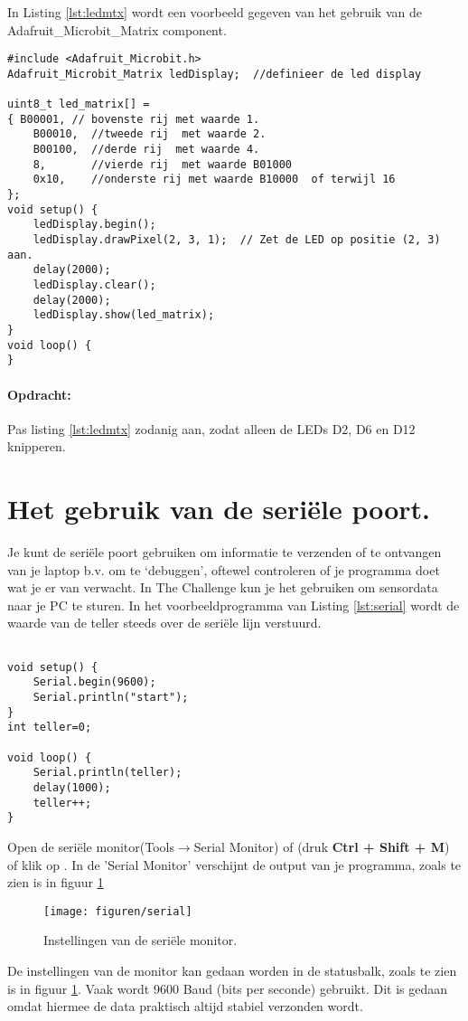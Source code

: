 In Listing \ref{lst:ledmtx} wordt een voorbeeld gegeven van het gebruik van de Adafruit\_Microbit\_Matrix component.

\begin{lstlisting}[caption= Een LED matrix demo,label={lst:ledmtx},firstnumber=1]		
#include <Adafruit_Microbit.h>
Adafruit_Microbit_Matrix ledDisplay;  //definieer de led display

uint8_t led_matrix[] =
{ B00001, // bovenste rij met waarde 1.
	B00010,  //tweede rij  met waarde 2.
	B00100,  //derde rij  met waarde 4.
	8,       //vierde rij  met waarde B01000
	0x10,    //onderste rij met waarde B10000  of terwijl 16
};
void setup() {
	ledDisplay.begin(); 
	ledDisplay.drawPixel(2, 3, 1);  // Zet de LED op positie (2, 3) aan.
	delay(2000);  
	ledDisplay.clear();  
	delay(2000);  
	ledDisplay.show(led_matrix);
}
void loop() {
}
\end{lstlisting}

\paragraph{Opdracht: }Pas listing \ref{lst:ledmtx} zodanig aan, zodat alleen de LEDs D2, D6 en D12 knipperen.\label{blz:opdrmLEDSmatrix}


\section{Het gebruik van de seriële poort.}

Je kunt de seriële poort gebruiken om informatie te verzenden of te ontvangen van je laptop b.v. om te ‘debuggen’, oftewel controleren of je programma doet wat je er van verwacht. In The Challenge kun je het gebruiken om sensordata naar je PC te sturen. In het voorbeeldprogramma van Listing \ref{lst:serial} wordt de waarde van de teller steeds over de seriële lijn verstuurd.

\begin{lstlisting}[caption= Een LED matrix demo,label={lst:serial},firstnumber=1]		
	
void setup() {
	Serial.begin(9600);
	Serial.println("start");
}
int teller=0;

void loop() {
	Serial.println(teller);
	delay(1000);
	teller++;
}
\end{lstlisting}


Open de seriële monitor(Tools$\rightarrow$Serial Monitor) of (druk \colorbox{mygray}{\textbf{Ctrl + Shift + M}}) of klik op . In de 'Serial Monitor' verschijnt de output van je programma, zoals te zien is in figuur \ref{fig:arser}
\begin{figure}[H]
	\captionsetup{justification=centering}
	\texttt{[image: figuren/serial]}
	\centering
	\caption{Instellingen van de seriële monitor.}
	\label{fig:arser}
\end{figure}
De instellingen van de monitor kan gedaan worden in de statusbalk, zoals te zien is in figuur \ref{fig:arser}.
Vaak wordt 9600 Baud (bits per seconde) gebruikt. Dit is gedaan omdat hiermee de data praktisch altijd stabiel verzonden wordt.

